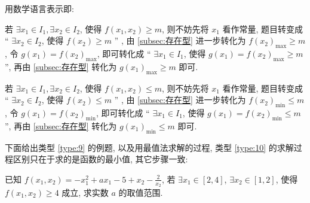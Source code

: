 用数学语言表示即:

\begin{type}\label{type:9}
  若 \(\exists {x}_{1} \in  {I}_{1}, \exists {x}_{2} \in  {I}_{2}\), 使得 \(f(x_1, x_2)  \geq  m\), 则不妨先将 \({x}_{1}\) 看作常量, 题目转变成 “ \(\exists {x}_{2} \in  {I}_{2}\), 使得 \(f\left( {x}_{2}\right)  \geq  m\) ” , 由 \ref{subsec:存在型} 进一步转化为 \(f{\left( {x}_{2}\right) }_{\max } \geq  m\), 令 \(g\left( {x}_{1}\right)  = f{\left( {x}_{2}\right) }_{\max }\), 即可转化成 “ \(\exists {x}_{1} \in  {I}_{1}\), 使得 \(g\left( {x}_{1}\right)  = f{\left( {x}_{2}\right) }_{\max } \geq  m\) ”, 再由 \ref{subsec:存在型} 转化为 \(g{\left( {x}_{1}\right) }_{\max } \geq  m\) 即可.
\end{type}

\begin{type}\label{type:10}
  若 \(\exists {x}_{1} \in  {I}_{1}, \exists {x}_{2} \in  {I}_{2}\), 使得 \(f(x_1, x_2)  \leq  m\), 则不妨先将 \({x}_{1}\) 看作常量, 题目转变成 “ \(\exists {x}_{2} \in  {I}_{2}\), 使得 \(f\left( {x}_{2}\right)  \leq  m\) ” , 由 \ref{subsec:存在型} 进一步转化为 \(f{\left( {x}_{2}\right) }_{\min } \leq  m\), 令 \(g\left( {x}_{1}\right)  = f{\left( {x}_{2}\right) }_{\min }\), 即可转化成 “ \(\exists {x}_{1} \in  {I}_{1}\), 使得 \(g\left( {x}_{1}\right)  = f{\left( {x}_{2}\right) }_{\min } \leq  m\) ”, 再由 \ref{subsec:存在型} 转化为 \(g{\left( {x}_{1}\right) }_{\min } \leq  m\) 即可.
\end{type}

下面给出类型 \ref{type:9} 的例题, 以及用最值法求解的过程, 类型 \ref{type:10} 的求解过程区别只在于求的是函数的最小值, 其它步骤一致:


\begin{variation}\label{variation:2.1.6}
  已知 \(f(x_1, x_2)  =  -{x}_{1}^{2} + a{x}_{1} -5 + {x}_{2} -\frac{2}{{x}_{2}}\), 若 \(\exists {x}_{1} \in  \left\lbrack  {2, 4}\right\rbrack\), \(\exists {x}_{2} \in  \left\lbrack  {1, 2}\right\rbrack\), 使得 \(f(x_1, x_2)  \geq  4\) 成立, 求实数 \(a\) 的取值范围.
\end{variation}

